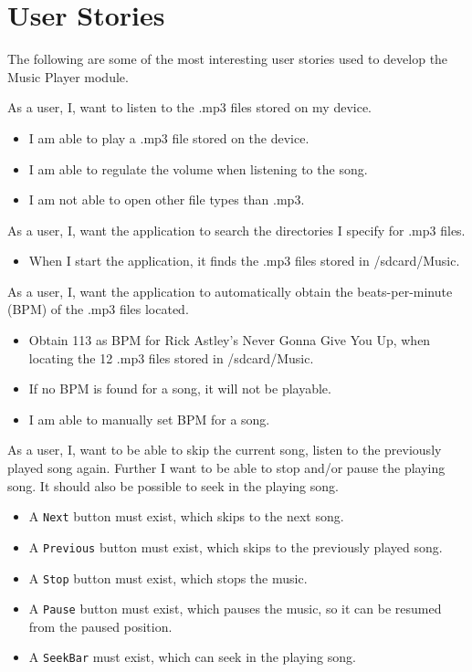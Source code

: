 \section{User Stories}
The following are some of the most interesting user stories used to develop the Music Player module. 


{As a user, I, want to listen to the .mp3 files stored on my device.}
{\begin{itemize}
\item I am able to play a .mp3 file stored on the device.
\item I am able to regulate the volume when listening to the song.
\item I am not able to open other file types than .mp3.
\end{itemize}}

{As a user, I, want the application to search the directories I specify for .mp3 files.}
{\begin{itemize}
\item When I start the application, it finds the .mp3 files stored in /sdcard/Music.
\end{itemize}}

{As a user, I, want the application to automatically obtain the beats-per-minute (BPM) of the .mp3 files located.}
{\begin{itemize}
\item Obtain 113 as BPM for Rick Astley's Never Gonna Give You Up, when locating the 12 .mp3 files stored in /sdcard/Music.
\item If no BPM is found for a song, it will not be playable.
\item I am able to manually set BPM for a song.
\end{itemize}}

{As a user, I, want to be able to skip the current song, listen to the previously played song again. 
Further I want to be able to stop and/or pause the playing song.
It should also be possible to seek in the playing song.}
{\begin{itemize}
\item A \texttt{Next} button must exist, which skips to the next song.
\item A \texttt{Previous} button must exist, which skips to the previously played song.
\item A \texttt{Stop} button must exist, which stops the music.
\item A \texttt{Pause} button must exist, which pauses the music, so it can be resumed from the paused position.
\item A \texttt{SeekBar} must exist, which can seek in the playing song.
\end{itemize}}

